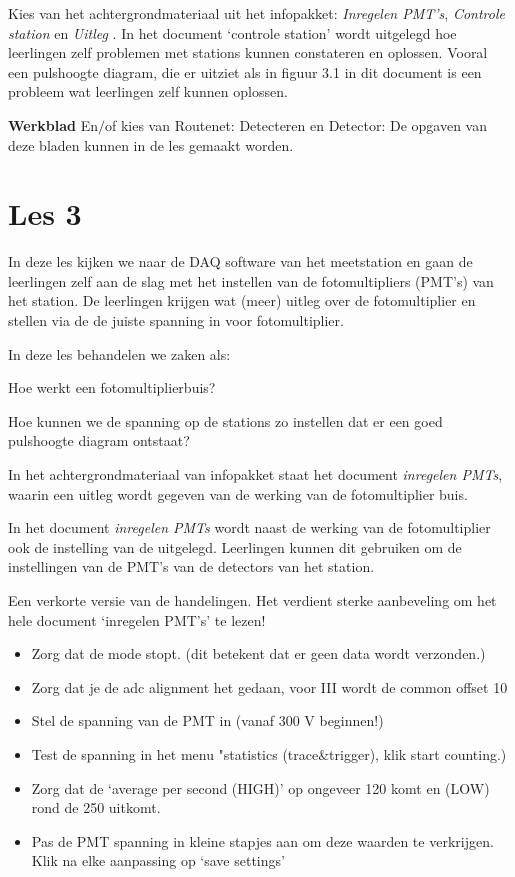 Kies van het achtergrondmateriaal uit het infopakket: \textit{Inregelen
PMT's}, \textit{Controle station} en \textit{Uitleg \hisparc}. In het
document `controle station' wordt uitgelegd hoe leerlingen zelf
problemen met stations kunnen constateren en oplossen. Vooral een
pulshoogte diagram, die er uitziet als in figuur 3.1 in dit document is
een probleem wat leerlingen zelf kunnen oplossen.

\textbf{Werkblad} 
En$/$of kies van Routenet: 
Detecteren en Detector:
De opgaven van deze bladen kunnen in de les gemaakt worden.

\section{Les 3}
In deze les kijken we naar de DAQ software van het meetstation en gaan de leerlingen 
zelf aan de slag met het instellen van de fotomultipliers (PMT's) van het station.
De leerlingen krijgen wat (meer) uitleg over de fotomultiplier en stellen via de \hisparc \daq
de juiste spanning in voor fotomultiplier.

In deze les behandelen we zaken als:
\begin{description}
    \item{Hoe werkt een fotomultiplierbuis?}
    \item{Hoe kunnen we de spanning op de stations zo instellen dat er een 
    goed pulshoogte diagram ontstaat?}
\end{description}

In het achtergrondmateriaal van infopakket staat het document \textit{inregelen PMTs},
waarin een uitleg wordt gegeven van de werking van de fotomultiplier buis.


In het document \textit{inregelen PMTs} wordt naast de werking van de fotomultiplier 
ook de instelling van de \hisparc \daq uitgelegd. Leerlingen kunnen dit gebruiken om 
de instellingen van de PMT's van de detectors van het \hisparc station.

Een verkorte versie van de handelingen. Het verdient sterke aanbeveling om het hele
document `inregelen PMT's' te lezen!
\begin{itemize}
    \item Zorg dat de \daq mode stopt. (dit betekent dat er geen data wordt verzonden.)
    \item Zorg dat je de adc alignment het gedaan, voor \hisparc III \daq wordt de common offset
    10
    \item Stel de spanning van de PMT in (vanaf 300 V beginnen!)
    \item Test de spanning in het menu "statistics (trace\&trigger), klik start counting.)
    \item Zorg dat de `average per second (HIGH)' op ongeveer 120 komt en (LOW) rond de 250 uitkomt.
    \item Pas de PMT spanning in kleine stapjes aan om deze waarden te verkrijgen. Klik na elke aanpassing op `save settings'
\end{itemize}

